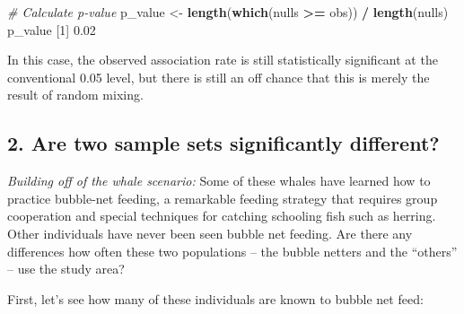 \documentclass[
]{book}
\newenvironment{Shaded}{\begin{snugshade}}{\end{snugshade}}
\newcommand{\CommentTok}[1]{\textcolor[rgb]{0.56,0.35,0.01}{\textit{#1}}}
\newcommand{\DecValTok}[1]{\textcolor[rgb]{0.00,0.00,0.81}{#1}}
\newcommand{\FloatTok}[1]{\textcolor[rgb]{0.00,0.00,0.81}{#1}}
\newcommand{\KeywordTok}[1]{\textcolor[rgb]{0.13,0.29,0.53}{\textbf{#1}}}
\newcommand{\NormalTok}[1]{#1}
\newcommand{\OperatorTok}[1]{\textcolor[rgb]{0.81,0.36,0.00}{\textbf{#1}}}
\newcommand{\StringTok}[1]{\textcolor[rgb]{0.31,0.60,0.02}{#1}}
\begin{document}
\begin{Shaded}
\begin{Highlighting}[]

\CommentTok{# Calculate p-value}
\NormalTok{p_value <-}\StringTok{ }\KeywordTok{length}\NormalTok{(}\KeywordTok{which}\NormalTok{(nulls }\OperatorTok{>=}\StringTok{ }\NormalTok{obs)) }\OperatorTok{/}\StringTok{ }\KeywordTok{length}\NormalTok{(nulls)}
\NormalTok{p_value}
\NormalTok{[}\DecValTok{1}\NormalTok{] }\FloatTok{0.02}
\end{Highlighting}
\end{Shaded}

In this case, the observed association rate is still statistically significant at the conventional 0.05 level, but there is still an off chance that this is merely the result of random mixing.

\hypertarget{are-two-sample-sets-significantly-different}{%
\subsection*{2. Are two sample sets significantly different?}\label{are-two-sample-sets-significantly-different}}

\emph{Building off of the whale scenario:} Some of these whales have learned how to practice bubble-net feeding, a remarkable feeding strategy that requires group cooperation and special techniques for catching schooling fish such as herring. Other individuals have never been seen bubble net feeding. Are there any differences how often these two populations -- the bubble netters and the ``others'' -- use the study area?

First, let's see how many of these individuals are known to bubble net feed:

\begin{Shaded}
\end{Shaded}
\end{document}
